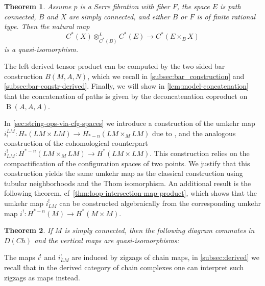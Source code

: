 \documentclass{scrartcl}
\theoremstyle{plain}
\newtheorem{theorem}{Theorem}[section]
\theoremstyle{definition}
\newcommand{\quiso}{\simeq}
\DeclareMathOperator{\id}{id}
\DeclareMathOperator{\Map}{Map}
\DeclareMathOperator{\BC}{B}
\begin{document}
\begin{theorem}
    Assume $p$ is a Serre fibration with fiber $F$, the space $E$ is path connected, $B$ and $X$ are simply connected, and either $B$ or $F$ is of finite rational type. Then the natural map
    $$C^*(X)\otimes_{C^*(B)}^L C^*(E) \to C^*(E\times_B X)$$
    is a quasi-isomorphism. 
\end{theorem}
The left derived tensor product can be computed by the two sided bar construction $B(M, A, N)$, which we recall in \cref{subsec:bar_construction} and \cref{subsec:bar-constr-derived}. Finally, we will show in \cref{lem:model-concatenation} that the concatenation of paths is given by the deconcatenation coproduct on $\BC(A, A, A)$.


In \cref{sec:string-ops-via-cfg-spaces} we introduce a construction of the umkehr map $i_!^{LM}\colon H_*(LM\times LM)\to H_{*-n}(LM\times_M LM)$ due to \cite{naef2019string}, and the analogous construction of the cohomological counterpart $i^!_{LM}\colon H^{*-n}(LM\times_M LM)\to H^*(LM\times LM)$. This construction relies on the compactification of the configuration spaces of two points. We justify that this construction yields the same umkehr map as the classical construction using tubular neighborhoods and the Thom isomorphism. An additional result is the following theorem, cf~\cref{thm:loop-intersection-map-product}, which shows that the umkehr map $i^!_{LM}$ can be constructed algebraically from the corresponding umkehr map $i^!\colon H^{*-n}(M)\to H^*(M\times M)$. 
\begin{theorem}
    If $M$ is simply connected, then the following diagram commutes in $D(Ch)$ and the vertical maps are quasi-isomorphisms:
    \begin{center}
    \end{center}
\end{theorem}
The maps $i^!$ and $i^!_{LM}$ are induced by zigzags of chain maps, in \cref{subsec:derived} we recall that in the derived category of chain complexes one can interpret such zigzags as maps instead. 
\end{document}
